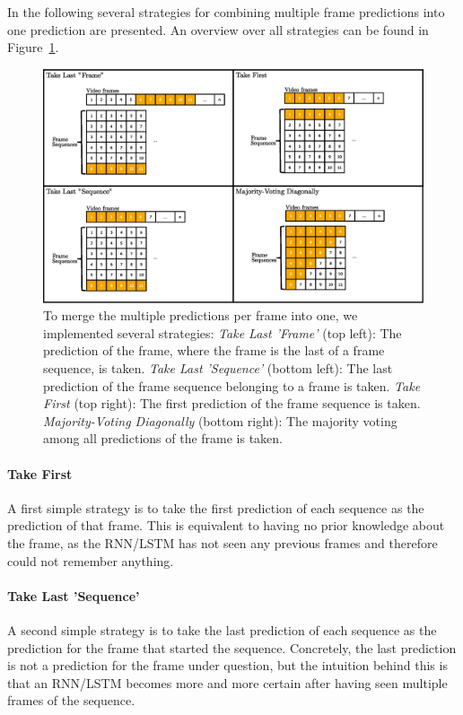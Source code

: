 In the following several strategies for combining multiple frame predictions into one prediction are presented.
An overview over all strategies can be found in Figure~\ref{fig:merging_strategies}.
\begin{figure}[!htb]
	\centering
	\includegraphics[scale=.5]{images/merging_strategies.eps}
	\caption{To merge the multiple predictions per frame into one, we implemented several strategies:
    \textit{Take Last 'Frame'} (top left): The prediction of the frame, where the frame is the last of a frame sequence, is taken.
    \textit{Take Last 'Sequence'} (bottom left): The last prediction of the frame sequence belonging to a frame is taken.
    \textit{Take First} (top right): The first prediction of the frame sequence is taken.
    \textit{Majority-Voting Diagonally} (bottom right): The majority voting among all predictions of the frame is taken.}
	\label{fig:merging_strategies}
\end{figure}
\paragraph{Take First}
A first simple strategy is to take the first prediction of each sequence as the prediction of that frame.
This is equivalent to having no prior knowledge about the frame, as the RNN/LSTM has not seen any previous frames and therefore could not remember anything.

\paragraph{Take Last 'Sequence'}
A second simple strategy is to take the last prediction of each sequence as the prediction for the frame that started the sequence.
Concretely, the last prediction is not a prediction for the frame under question, but the intuition behind this is that an RNN/LSTM becomes more and more certain after having seen multiple frames of the sequence.

